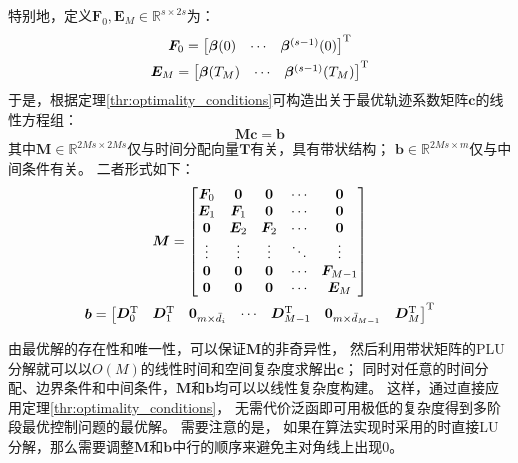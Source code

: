 特别地，定义$\bm{F}_0,\bm{E}_M \in \mathbb{R}^{s \times 2s}$为：
\begin{gather}
  \bm{F}_0 = {
    \begin{bmatrix}
      \bm{\beta}(0) & \cdots & \bm{\beta}^{(s-1)}(0)
    \end{bmatrix}
  }^{\text{T}} \label{equ:F_0}\\
  \bm{E}_M = {
    \begin{bmatrix}
      \bm{\beta}(T_M) & \cdots & \bm{\beta}^{(s-1)}(T_M)
    \end{bmatrix}
  }^{\text{T}}
  \label{equ:E_M}
\end{gather}
于是，根据定理\ref{thr:optimality_conditions}可构造出关于最优轨迹系数矩阵$\bm{c}$的线性方程组：
\begin{equation}
  \bm{Mc} = \bm{b}
  \label{equ:linear_equation_system_wrt_c}
\end{equation}
其中$\bm{M} \in \mathbb{R}^{2Ms \times 2Ms}$仅与时间分配向量$\bm{T}$有关，具有带状结构；
$\bm{b} \in \mathbb{R}^{2Ms \times m}$仅与中间条件有关。
二者形式如下：
\begin{gather}
  \bm{M} = 
    \begin{bmatrix}
      \bm{F}_0 & \textbf{0} & \textbf{0} & \cdots & \textbf{0} \\
      \bm{E}_1 & \bm{F}_1 & \textbf{0} & \cdots & \textbf{0} \\
      \textbf{0} & \bm{E}_2 & \bm{F}_2 & \cdots & \textbf{0} \\ 
      \vdots & \vdots & \vdots & \ddots & \vdots \\
      \textbf{0} & \textbf{0} & \textbf{0} & \cdots & \bm{F}_{M-1} \\
      \textbf{0} & \textbf{0} & \textbf{0} & \cdots & \bm{E}_{M}
    \end{bmatrix}
   \label{equ:M} \\
  \bm{b} = {
    \begin{bmatrix}
      \bm{D}_0^{\text{T}} & \bm{D}_1^{\text{T}} & \textbf{0}_{m \times \bar{d}_i} & 
      \cdots & \bm{D}_{M-1}^{\text{T}} & \textbf{0}_{m \times \bar{d}_{M-1}} & \bm{D}_{M}^{\text{T}}
    \end{bmatrix}
  }^{\text{T}} \label{equ:b}
\end{gather}

由最优解的存在性和唯一性，可以保证$\bm{M}$的非奇异性，
然后利用带状矩阵的PLU分解就可以以$O(M)$的线性时间和空间复杂度求解出$\bm{c}$；
同时对任意的时间分配、边界条件和中间条件，$\bm{M}$和$\bm{b}$均可以以线性复杂度构建。
这样，通过直接应用定理\ref{thr:optimality_conditions}，
无需代价泛函即可用极低的复杂度得到多阶段最优控制问题的最优解。
需要注意的是，
如果在算法实现时采用的时直接LU分解，那么需要调整$\bm{M}$和$\bm{b}$中行的顺序来避免主对角线上出现0。

